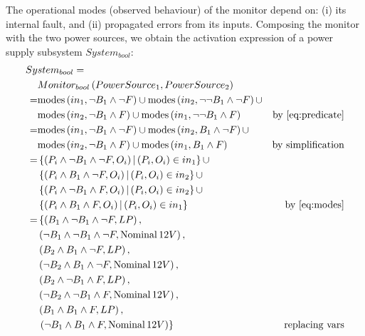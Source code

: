 \documentclass[12pt,openright,twoside,a4paper,oldfontcommands,english,brazil,final]{abntex2}
\theoremstyle{theo}
\newcommand{\Nominal}[1]{\ensuremath\mathop{\mathrm{Nominal}} #1}
\newcommand{\modes}[2]{\ensuremath\mathrm{modes}\left(#1,#2\right)}
\begin{document}
The operational modes (observed behaviour) of the monitor depend on: (i) its internal fault, and (ii) propagated errors from its inputs.
Composing the monitor with the two power sources, we obtain the \ac{activation} expression of a power supply subsystem $System_{bool}$:
%
\begin{align*}
Sy&stem_{bool} = \\
 & Monitor_{bool} \left(PowerSource_1, PowerSource_2\right) \\
  = & \modes{in_1}{\lnot B_1 \land \lnot F} \cup
  \modes{in_2}{\lnot \lnot B_1 \land \lnot F} \cup\\
  & \modes{in_2}{\lnot B_1 \land F} \cup
  \modes{in_1}{\lnot \lnot B_1 \land F} & \text{by \cref{eq:predicate}}\\
  = &\modes{in_1}{\lnot B_1 \land \lnot F} \cup
  \modes{in_2}{ B_1 \land \lnot F} \cup\\
  &\modes{in_2}{\lnot B_1 \land F} \cup
  \modes{in_1}{B_1 \land F} & \text{by simplification}\\
  = & \left\{ \left(P_i \land \lnot B_1 \land \lnot F, O_i\right) | \left(P_i, O_i\right) \in in_1  \right\} \cup\\
  & \left\{ \left(P_i \land B_1 \land \lnot F, O_i\right) | \left(P_i, O_i\right) \in in_2  \right\} \cup\\
  & \left\{ \left(P_i \land \lnot B_1 \land F, O_i\right)| \left(P_i, O_i\right) \in in_2  \right\} \cup \\
  & \left\{ \left(P_i \land B_1 \land F, O_i\right)| \left(P_i, O_i\right) \in in_1 \right\} & \text{by \cref{eq:modes}}\\
  = & \left\{ 
      \left(B_1 \land \lnot B_1 \land \lnot F, LP\right), \right.\\
  &   \left(\lnot B_1 \land \lnot B_1 \land \lnot F, \Nominal{12V}\right), \\
  &   \left(B_2 \land B_1 \land \lnot F, LP\right),\\
  &   \left(\lnot B_2 \land B_1 \land \lnot F, \Nominal{12V}\right), \\
  &   \left(B_2 \land \lnot B_1 \land F, LP\right), \\
  &   \left(\lnot B_2 \land \lnot B_1 \land F, \Nominal{12V}\right),\\
  &   \left(B_1 \land B_1 \land F, LP\right), \\
  &   \left.\left(\lnot B_1 \land B_1 \land F, \Nominal{12V}\right)\right\}
    & \text{replacing vars}\\
\end{align*}
\end{document}
